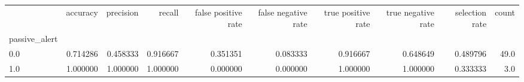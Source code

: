 \begin{tabular}{lrrrrrrrrr}
\toprule
{} &  accuracy &  precision &    recall &  false positive rate &  false negative rate &  true positive rate &  true negative rate &  selection rate &  count \\
passive\_alert &           &            &           &                      &                      &                     &                     &                 &        \\
\midrule
0.0           &  0.714286 &   0.458333 &  0.916667 &             0.351351 &             0.083333 &            0.916667 &            0.648649 &        0.489796 &   49.0 \\
1.0           &  1.000000 &   1.000000 &  1.000000 &             0.000000 &             0.000000 &            1.000000 &            1.000000 &        0.333333 &    3.0 \\
\bottomrule
\end{tabular}
